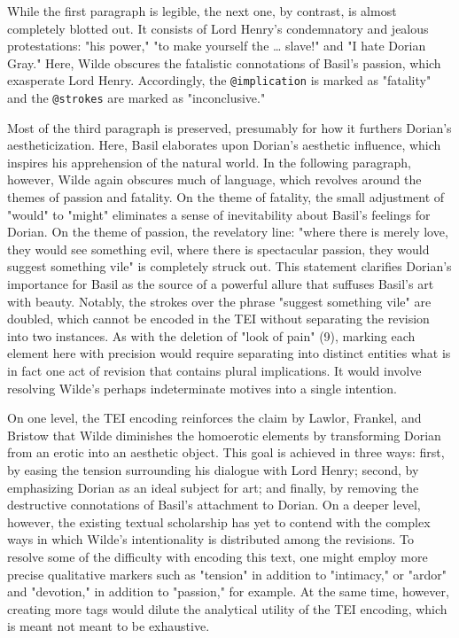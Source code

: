 \documentclass[11pt]{article}
\begin{document}
While the first paragraph is legible, the next one, by contrast, is
almost completely blotted out. It consists of Lord Henry's
condemnatory and jealous protestations: "his power," "to make yourself
the \ldots{}  slave!" and "I hate Dorian Gray." Here, Wilde obscures the
fatalistic connotations of Basil's passion, which exasperate Lord
Henry.  Accordingly, the \texttt{@implication} is marked as "fatality" and
the \texttt{@strokes} are marked as "inconclusive."

Most of the third paragraph is preserved, presumably for how it
furthers Dorian's aestheticization. Here, Basil elaborates upon
Dorian's aesthetic influence, which inspires his apprehension of the
natural world. In the following paragraph, however, Wilde again
obscures much of language, which revolves around the themes of passion
and fatality. On the theme of fatality, the small adjustment of
"would" to "might" eliminates a sense of inevitability about Basil's
feelings for Dorian.  On the theme of passion, the revelatory line:
"where there is merely love, they would see something evil, where
there is spectacular passion, they would suggest something vile" is
completely struck out. This statement clarifies Dorian's importance
for Basil as the source of a powerful allure that suffuses Basil's art
with beauty. Notably, the strokes over the phrase "suggest something
vile" are doubled, which cannot be encoded in the TEI without
separating the revision into two instances. As with the deletion of
"look of pain" (9), marking each element here with precision would
require separating into distinct entities what is in fact one act of
revision that contains plural implications. It would involve resolving
Wilde's perhaps indeterminate motives into a single intention.

On one level, the TEI encoding reinforces the claim by Lawlor,
Frankel, and Bristow that Wilde diminishes the homoerotic elements by
transforming Dorian from an erotic into an aesthetic object. This goal
is achieved in three ways: first, by easing the tension surrounding
his dialogue with Lord Henry; second, by emphasizing Dorian as an
ideal subject for art; and finally, by removing the destructive
connotations of Basil's attachment to Dorian. On a deeper level,
however, the existing textual scholarship has yet to contend with the
complex ways in which Wilde's intentionality is distributed among the
revisions. To resolve some of the difficulty with encoding this text,
one might employ more precise qualitative markers such as "tension" in
addition to "intimacy," or "ardor" and "devotion," in addition to
"passion," for example. At the same time, however, creating more tags
would dilute the analytical utility of the TEI encoding, which is
meant not meant to be exhaustive. 
\end{document}
